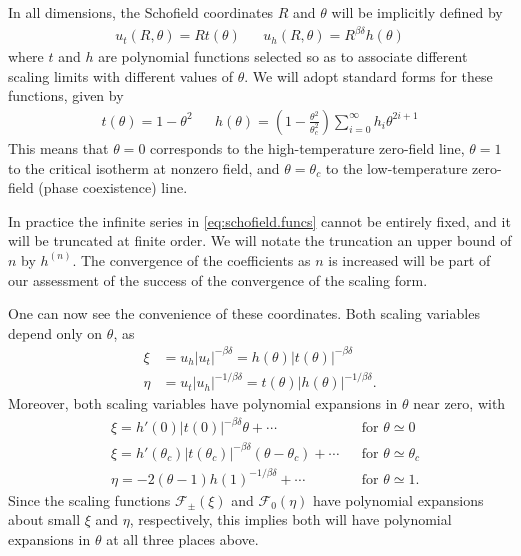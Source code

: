 \documentclass[
  aps,
  pre,
  preprint,
  longbibliography,
  floatfix
]{revtex4-2}
\begin{document}
In all dimensions, the Schofield coordinates $R$ and $\theta$ will be implicitly defined by
\begin{align} \label{eq:schofield}
  u_t(R, \theta) = Rt(\theta)
  &&
  u_h(R, \theta) = R^{\beta\delta}h(\theta)
\end{align}
where $t$ and $h$ are polynomial functions selected so as to associate different scaling limits with different values of $\theta$. We will adopt standard forms for these functions, given by
\begin{align} \label{eq:schofield.funcs}
  t(\theta)=1-\theta^2
  &&
  h(\theta)=\left(1-\frac{\theta^2}{\theta_c^2}\right)\sum_{i=0}^\infty h_i\theta^{2i+1}
\end{align}
This means that $\theta=0$ corresponds to the high-temperature zero-field line,
$\theta=1$ to the critical isotherm at nonzero field, and $\theta=\theta_c$ to
the low-temperature zero-field (phase coexistence) line.

In practice the infinite series in \eqref{eq:schofield.funcs} cannot be
entirely fixed, and it will be truncated at finite order. We will notate the
truncation an upper bound of $n$ by $h^{(n)}$. The convergence of the
coefficients as $n$ is increased will be part of our assessment of the success
of the convergence of the scaling form.

One can now see the convenience of these coordinates. Both scaling variables depend only on $\theta$, as
\begin{align}
  \xi&=u_h|u_t|^{-\beta\delta}=h(\theta)|t(\theta)|^{-\beta\delta} \\
  \eta&=u_t|u_h|^{-1/\beta\delta}=t(\theta)|h(\theta)|^{-1/\beta\delta}.
\end{align}
Moreover, both scaling variables have polynomial expansions in $\theta$ near zero, with
\begin{align}
  &\xi= h'(0)|t(0)|^{-\beta\delta}\theta+\cdots  && \text{for $\theta\simeq0$}\\
  &\xi=h'(\theta_c)|t(\theta_c)|^{-\beta\delta}(\theta-\theta_c)+\cdots && \text{for $\theta\simeq\theta_c$}
  \\
  &\eta=-2(\theta-1)h(1)^{-1/\beta\delta}+\cdots && \text{for $\theta\simeq1$}.
\end{align}
Since the scaling functions $\mathcal F_\pm(\xi)$ and $\mathcal F_0(\eta)$ have
polynomial expansions about small $\xi$ and $\eta$, respectively, this implies
both will have polynomial expansions in $\theta$ at all three places above.
\end{document}
